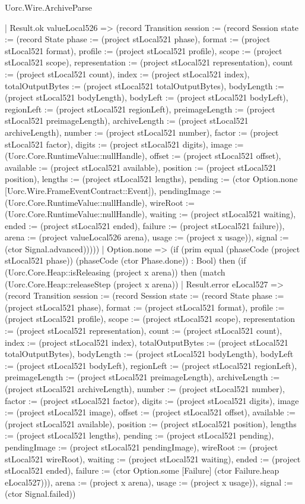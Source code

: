 \begin{lexlean}{Uorc.Wire.ArchiveParse}
\begin{semanticmodule}
{      | Result.ok valueLocal526 => (record Transition {session := (record Session {state := (record State {phase := (project stLocal521 phase), format := (project stLocal521 format), profile := (project stLocal521 profile), scope := (project stLocal521 scope), representation := (project stLocal521 representation), count := (project stLocal521 count), index := (project stLocal521 index), totalOutputBytes := (project stLocal521 totalOutputBytes), bodyLength := (project stLocal521 bodyLength), bodyLeft := (project stLocal521 bodyLeft), regionLeft := (project stLocal521 regionLeft), preimageLength := (project stLocal521 preimageLength), archiveLength := (project stLocal521 archiveLength), number := (project stLocal521 number), factor := (project stLocal521 factor), digits := (project stLocal521 digits), image := (Uorc.Core.RuntimeValue::nullHandle), offset := (project stLocal521 offset), available := (project stLocal521 available), position := (project stLocal521 position), lengths := (project stLocal521 lengths), pending := (ctor Option.none [Uorc.Wire.FrameEventContract::Event]), pendingImage := (Uorc.Core.RuntimeValue::nullHandle), wireRoot := (Uorc.Core.RuntimeValue::nullHandle), waiting := (project stLocal521 waiting), ended := (project stLocal521 ended), failure := (project stLocal521 failure)}), arena := (project valueLocal526 arena), usage := (project x usage)}), signal := (ctor Signal.advanced)}))))
    | Option.none => (if (prim equal (phaseCode (project stLocal521 phase)) (phaseCode (ctor Phase.done)) : Bool) then (if (Uorc.Core.Heap::isReleasing (project x arena)) then (match (Uorc.Core.Heap::releaseStep (project x arena))
      | Result.error eLocal527 => (record Transition {session := (record Session {state := (record State {phase := (project stLocal521 phase), format := (project stLocal521 format), profile := (project stLocal521 profile), scope := (project stLocal521 scope), representation := (project stLocal521 representation), count := (project stLocal521 count), index := (project stLocal521 index), totalOutputBytes := (project stLocal521 totalOutputBytes), bodyLength := (project stLocal521 bodyLength), bodyLeft := (project stLocal521 bodyLeft), regionLeft := (project stLocal521 regionLeft), preimageLength := (project stLocal521 preimageLength), archiveLength := (project stLocal521 archiveLength), number := (project stLocal521 number), factor := (project stLocal521 factor), digits := (project stLocal521 digits), image := (project stLocal521 image), offset := (project stLocal521 offset), available := (project stLocal521 available), position := (project stLocal521 position), lengths := (project stLocal521 lengths), pending := (project stLocal521 pending), pendingImage := (project stLocal521 pendingImage), wireRoot := (project stLocal521 wireRoot), waiting := (project stLocal521 waiting), ended := (project stLocal521 ended), failure := (ctor Option.some [Failure] (ctor Failure.heap eLocal527))}), arena := (project x arena), usage := (project x usage)}), signal := (ctor Signal.failed)})
}
\end{semanticmodule}
\end{lexlean}
